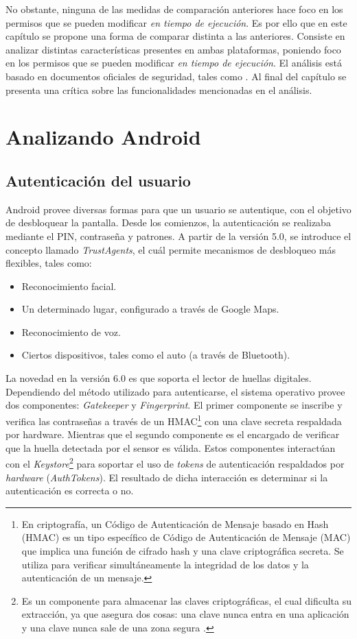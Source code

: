 No obstante, ninguna de las medidas de comparación anteriores hace foco en los permisos que se pueden modificar \emph{en tiempo de ejecución}. Es por ello que en este capítulo se propone una forma de comparar distinta a las anteriores. Consiste en analizar distintas características presentes en ambas plataformas, poniendo foco en los permisos que se pueden modificar \emph{en tiempo de ejecución}. El análisis está basado en documentos oficiales de seguridad, tales como \cite{aossec, asreview2015, asg}. Al final del capítulo se presenta una crítica sobre las funcionalidades mencionadas en el análisis.
\section{Analizando Android}
\subsection{Autenticación del usuario}
Android provee diversas formas para que un usuario se autentique, con el objetivo de desbloquear la pantalla. Desde los comienzos, la autenticación se realizaba mediante el PIN, contraseña y patrones. A partir de la versión 5.0, se introduce el concepto llamado \textit{TrustAgents}, el cuál permite mecanismos de desbloqueo más flexibles, tales como:
\begin{itemize}
	\item Reconocimiento facial.
	\item Un determinado lugar, configurado a través de Google Maps.
	\item Reconocimiento de voz.
	\item Ciertos dispositivos, tales como el auto (a través de Bluetooth).
\end{itemize}
La novedad en la versión 6.0 es que soporta el lector de huellas digitales.\\

Dependiendo del método utilizado para autenticarse, el sistema operativo provee dos componentes: \textit{Gatekeeper} y \textit{Fingerprint}. El primer componente se inscribe y verifica las contraseñas a través de un HMAC\footnote{En criptografía, un Código de Autenticación de Mensaje basado en Hash (HMAC) es un tipo específico de Código de Autenticación de Mensaje (MAC) que implica una función de cifrado hash y una clave criptográfica secreta. Se utiliza para verificar simultáneamente la integridad de los datos y la autenticación de un mensaje.} con una clave secreta respaldada por hardware. Mientras que el segundo componente es el encargado de verificar que la huella detectada por el sensor es válida. Estos componentes interactúan con el \textit{Keystore}\footnote{Es un componente para almacenar las claves criptográficas, el cual dificulta su extracción, ya que asegura dos cosas: una clave nunca entra en una aplicación y una clave nunca sale de una zona segura \cite{dakss}.} para soportar el uso de \textit{tokens} de autenticación respaldados por \textit{hardware} (\textit{AuthTokens}). El resultado de dicha interacción es determinar si la autenticación es correcta o no.\\

